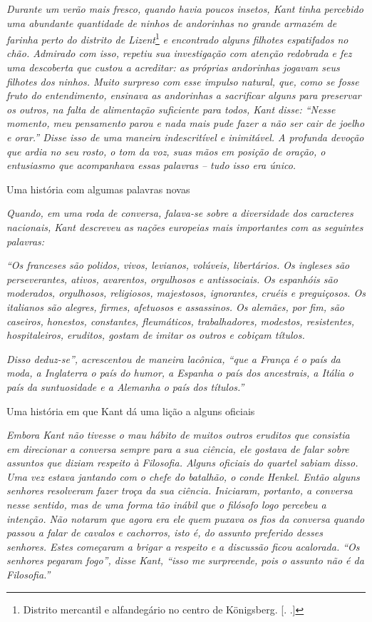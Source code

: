 \emph{Durante um verão mais fresco, quando havia poucos insetos, Kant
tinha percebido uma abundante quantidade de ninhos de andorinhas no
grande armazém de farinha perto do distrito de Lizent}\footnote{Distrito
  mercantil e alfandegário no centro de Königsberg. [. .]}
\emph{e encontrado alguns filhotes espatifados no chão. Admirado com
isso, repetiu sua investigação com atenção redobrada e fez uma
descoberta que custou a acreditar: as próprias andorinhas jogavam seus
filhotes dos ninhos. Muito surpreso com esse impulso natural, que, como
se fosse fruto do entendimento, ensinava as andorinhas a sacrificar
alguns para preservar os outros, na falta de alimentação suficiente para
todos, Kant disse: ``Nesse momento, meu pensamento parou e nada mais
pude fazer a não ser cair de joelho e orar.'' Disse isso de uma maneira
indescritível e inimitável. A profunda devoção que ardia no seu rosto, o
tom da voz, suas mãos em posição de oração, o entusiasmo que acompanhava
essas palavras -- tudo isso era único.}\bigskip

Uma história com algumas palavras novas

\emph{Quando, em uma roda de conversa, falava-se sobre a diversidade dos
caracteres nacionais, Kant descreveu as nações europeias mais
importantes com as seguintes palavras:}

\emph{``Os franceses são polidos, vivos, levianos, volúveis,
libertários. Os ingleses são perseverantes, ativos, avarentos,
orgulhosos e antissociais. Os espanhóis são moderados, orgulhosos,
religiosos, majestosos, ignorantes, cruéis e preguiçosos. Os italianos
são alegres, firmes, afetuosos e assassinos. Os alemães, por fim, são
caseiros, honestos, constantes, fleumáticos, trabalhadores, modestos,
resistentes, hospitaleiros, eruditos, gostam de imitar os outros e
cobiçam títulos.}

\emph{Disso deduz-se'', acrescentou de maneira lacônica, ``que a França
é o país da moda, a Inglaterra o país do humor, a Espanha o país dos
ancestrais, a Itália o país da suntuosidade e a Alemanha o país dos
títulos.''}\bigskip

Uma história em que Kant dá uma lição a alguns oficiais

\emph{Embora Kant não tivesse o mau hábito de muitos outros eruditos que
consistia em direcionar a conversa sempre para a sua ciência, ele
gostava de falar sobre assuntos que diziam respeito à Filosofia. Alguns
oficiais do quartel sabiam disso. Uma vez estava jantando com o chefe do
batalhão, o conde Henkel. Então alguns senhores resolveram fazer troça
da sua ciência. Iniciaram, portanto, a conversa nesse sentido, mas de
uma forma tão inábil que o filósofo logo percebeu a intenção. Não
notaram que agora era ele quem puxava os fios da conversa quando passou
a falar de cavalos e cachorros, isto é, do assunto preferido desses
senhores. Estes começaram a brigar a respeito e a discussão ficou
acalorada. ``Os senhores pegaram fogo'', disse Kant, ``isso me
surpreende, pois o assunto não é da Filosofia.''}\bigskip

